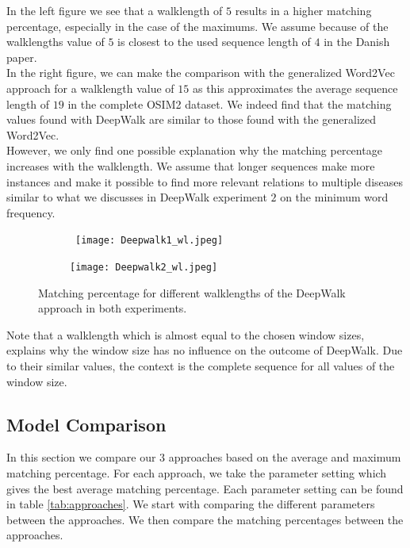 In the left figure we see that a walklength of $5$ results in a higher matching percentage, especially in the case of the maximums. We assume because of the walklengths value of $5$ is closest to the used sequence length of $4$ in the Danish paper. \\

In the right figure, we can make the comparison with the generalized Word2Vec approach for a walklength value of $15$ as this approximates the average sequence length of $19$ in the complete OSIM2 dataset. We indeed find that the matching values found with DeepWalk are similar to those found with the generalized Word2Vec. \\
However, we only find one possible explanation why the matching percentage increases with the walklength. We assume that longer sequences make more instances and make it possible to find more relevant relations to multiple diseases similar to what we discusses in DeepWalk experiment $2$ on the minimum word frequency. \\

\begin{figure}[!htb]
	\centering
	\begin{subfigure}[b]{.49\textwidth}\
		\texttt{[image: Deepwalk1\_wl.jpeg]}
	\end{subfigure}
	\begin{subfigure}[b]{.49\textwidth}
		\texttt{[image: Deepwalk2\_wl.jpeg]}
	\end{subfigure}
	\caption{Matching percentage for different walklengths of the DeepWalk approach in both experiments.}
	\label{fig:dw_wl}
\end{figure}

Note that a walklength which is almost equal to the chosen window sizes, explains why the window size has no influence on the outcome of DeepWalk. Due to their similar values, the context is the complete sequence for all values of the window size.


\subsection{Model Comparison}

In this section we compare our $3$ approaches based on the average and maximum matching percentage. For each approach, we take the parameter setting which gives the best average matching percentage. Each parameter setting can be found in table \ref{tab:approaches}. We start with comparing the different parameters between the approaches. We then compare the matching percentages between the approaches. 

